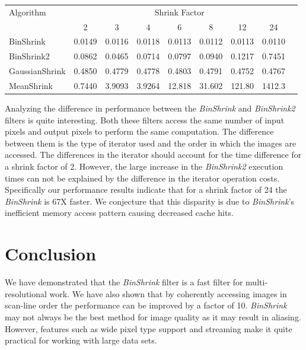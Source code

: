 \documentclass{InsightArticle}
\begin{document}
\begin{table}
\begin{center}
\begin{tabular}{l|*{7}{c}r}
Algorithm & \multicolumn{7}{c}{Shrink Factor} \\
  &            2 & 3 & 4 & 6 & 8 & 12 & 24 \\
\hline
BinShrink &     0.0149 & 0.0116 & 0.0118 & 0.0113 & 0.0112 & 0.0113 & 0.0110\\
BinShrink2 &    0.0862 & 0.0465 & 0.0714 & 0.0797 & 0.0940 & 0.1217 & 0.7451\\
GaussianShrink &0.4850 & 0.4779 & 0.4778 & 0.4803 & 0.4791 & 0.4752 & 0.4767\\
MeanShrink &    0.7440 & 3.9093 & 3.9264 & 12.818 & 31.602 & 121.80 & 1412.3\\
\end{tabular}
\label{tab:ShrinkPerformance}
\end{center}
\end{table}

Analyzing the difference in performance between the \textit{BinShrink} 
and \textit{BinShrink2} filters is quite interesting. Both these
filters access the same number of input pixels and output pixels to
perform the same computation. The difference between them is the type of iterator
used and the order in which the images are accessed. The differences
in the iterator should account for the time difference
for a shrink factor of 2. However, the large increase in the
\textit{BinShrink2} execution times can not be explained by the
difference in the iterator operation costs. Specifically our
performance results indicate that for a shrink factor of 24 the
\textit{BinShrink} is 67X faster. We conjecture that this disparity is
due to \textit{BinShrink}'s inefficient memory access pattern 
causing decreased cache hits.

\section{Conclusion}

We have demonstrated that the \textit{BinShrink} filter is a fast
filter for multi-resolutional work. We have also shown that
by coherently accessing images in scan-line order the performance can
be improved by a factor of 10. 
\textit{BinShrink} may not always be the best method for image quality as it
may result in aliasing. However, features such as wide pixel type
support and streaming make it quite practical for working with large
data sets.




\end{document}
